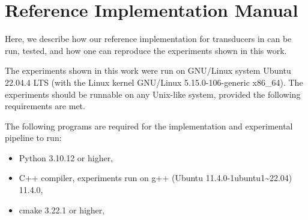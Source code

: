 \chapter{Reference Implementation Manual}

Here, we describe how our reference implementation for transducers in \mata can be run, tested, and how one can reproduce the experiments shown in this work.

The experiments shown in this work were run on GNU/Linux system Ubuntu 22.04.4 LTS (with the Linux kernel GNU/Linux 5.15.0-106-generic x86\_64).
The experiments should be runnable on any Unix-like system, provided the following requirements are met.

The following programs are required for the implementation and experimental pipeline to run:
\begin{itemize}
    \item Python 3.10.12 or higher,
    \item C++ compiler, experiments run on g++ (Ubuntu 11.4.0-1ubuntu1\textasciitilde 22.04) 11.4.0,
    \item cmake 3.22.1 or higher,
\end{itemize}

